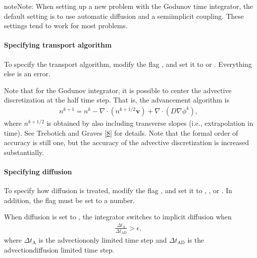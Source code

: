 \documentclass[letterpaper,10pt,english]{sphinxmanual}
\begin{document}
\begin{sphinxadmonition}{note}{Note:}
When setting up a new problem with the Godunov time integrator, the default setting is to use automatic diffusion and a semi\sphinxhyphen{}implicit coupling.
These settings tend to work for most problems.
\end{sphinxadmonition}


\paragraph{Specifying transport algorithm}
\label{\detokenize{Applications/CdrPlasmaModel:specifying-transport-algorithm}}
To specify the transport algorithm, modify the flag , and set it to  or .
Everything else is an error.

Note that for the Godunov integrator, it is possible to center the advective discretization at the half time step.
That is, the advancement algorithm is
\begin{equation*}
\begin{split}n^{k+1} = n^{k} - \nabla\cdot\left(n^{k+1/2}\mathbf{v}\right) + \nabla\cdot\left(D\nabla\phi^k\right),\end{split}
\end{equation*}
where \(n^{k+1/2}\) is obtained by also including transverse slopes (i.e., extrapolation in time).
See Trebotich and Graves {[}\hyperlink{cite.ZZReferences:id157}{8}{]} for details.
Note that the formal order of accuracy is still one, but the accuracy of the advective discretization is increased substantially.


\paragraph{Specifying diffusion}
\label{\detokenize{Applications/CdrPlasmaModel:specifying-diffusion}}
To specify how diffusion is treated, modify the flag , and set it to , , or .
In addition, the flag  must be set to a number.

When diffusion is set to , the integrator switches to implicit diffusion when
\begin{equation*}
\begin{split}\frac{\Delta t_{\textrm{A}}}{\Delta t_{\textrm{AD}}} > \epsilon,\end{split}
\end{equation*}
where \(\Delta t_{\textrm{A}}\) is the advection\sphinxhyphen{}only limited time step and \(\Delta t_{\textrm{AD}}\) is the advection\sphinxhyphen{}diffusion limited time step.
\end{document}
